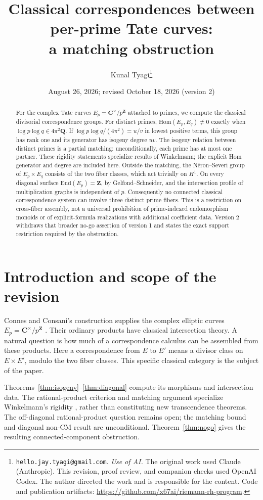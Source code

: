 \documentclass[11pt]{article}
\title{Classical correspondences between per-prime Tate curves:\\
a matching obstruction}
\author{Kunal Tyagi\thanks{\texttt{hello.jay.tyagi@gmail.com}.
\emph{Use of AI.} The original work used Claude (Anthropic). This revision,
proof review, and companion checks used OpenAI Codex. The author directed the
work and is responsible for the content. Code and publication artifacts:
\url{https://github.com/x67ai/riemann-rh-program}.}}
\date{August 26, 2026; revised October 18, 2026 (version 2)}
\theoremstyle{definition}
\theoremstyle{remark}
\newcommand{\Z}{\mathbf{Z}}
\newcommand{\Q}{\mathbf{Q}}
\newcommand{\C}{\mathbf{C}}
\newcommand{\Hom}{\mathrm{Hom}}
\newcommand{\End}{\mathrm{End}}
\begin{document}
\maketitle
\begin{abstract}
For the complex Tate curves $E_p=\C^\times/p^\Z$ attached to primes, we compute
the classical divisorial correspondence groups. For distinct primes,
$\Hom(E_p,E_q)\ne0$ exactly when
$\log p\log q\in4\pi^2\Q$. If $\log p\log q/(4\pi^2)=u/v$ in lowest positive
terms, this group has rank one and its generator has isogeny degree $uv$.
The isogeny relation between distinct primes is a partial matching:
unconditionally, each prime has at most one partner. These rigidity statements
specialize results of Winkelmann; the explicit Hom generator and degree are
included here. Outside the matching, the N\'eron--Severi group of $E_p\times E_q$
consists of the two fiber classes, which act trivially on $H^1$.
On every diagonal surface $\End(E_p)=\Z$, by Gelfond--Schneider, and the
intersection profile of multiplication graphs is independent of $p$.
Consequently no connected classical correspondence system can involve three
distinct prime fibers. This is a restriction on cross-fiber assembly, not a
universal prohibition of prime-indexed endomorphism monoids or of
explicit-formula realizations with additional coefficient data. Version 2
withdraws that broader no-go assertion of version 1 and states the exact
support restriction required by the obstruction.
\end{abstract}

\section{Introduction and scope of the revision}\label{sec:summary}
Connes and Consani's construction supplies the complex elliptic curves
$E_p=\C^\times/p^\Z$ \cite{CC26}. Their ordinary products have classical
intersection theory. A natural question is how much of a correspondence
calculus can be assembled from these products. Here a correspondence from
$E$ to $E'$ means a divisor class on $E\times E'$, modulo the two fiber
classes. This specific classical category is the subject of the paper.

Theorems~\ref{thm:isogeny}--\ref{thm:diagonal} compute its morphisms and
intersection data. The rational-product criterion and matching argument
specialize Winkelmann's rigidity \cite{Wi04}, rather than constituting new
transcendence theorems. The off-diagonal rational-product question remains
open; the matching bound and diagonal non-CM result are unconditional.
Theorem~\ref{thm:nogo} gives the resulting connected-component obstruction.
\end{document}
